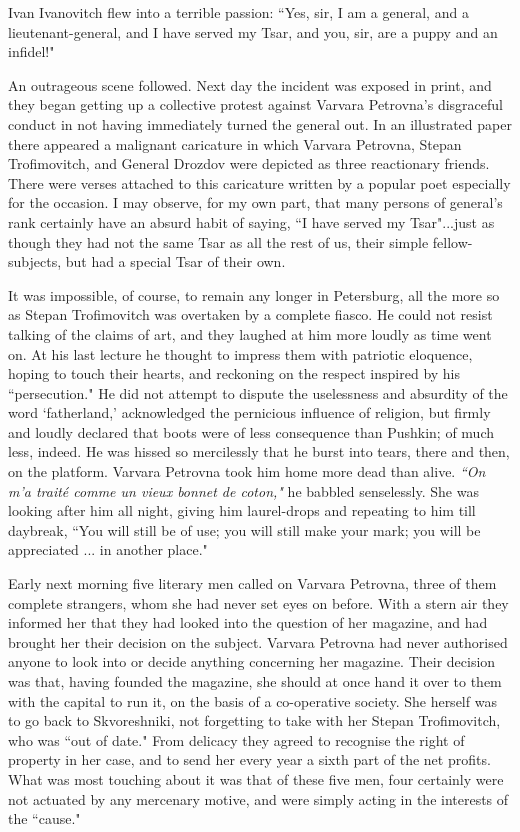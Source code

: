 \documentclass[12pt]{article}
\begin{document}
\vspace{12pt}
Ivan Ivanovitch flew into a terrible passion: ``Yes, sir, I am a general,
and a lieutenant-general, and I have served my Tsar, and you, sir, are a
puppy and an infidel!"


\vspace{12pt}
An outrageous scene followed. Next day the incident was exposed in
print, and they began getting up a collective protest against Varvara
Petrovna's disgraceful conduct in not having immediately turned
the general out. In an illustrated paper there appeared a malignant
caricature in which Varvara Petrovna, Stepan Trofimovitch, and General
Drozdov were depicted as three reactionary friends. There were verses
attached to this caricature written by a popular poet especially for the
occasion. I may observe, for my own part, that many persons of general's
rank certainly have an absurd habit of saying, ``I have served my
Tsar"...just as though they had not the same Tsar as all the rest of us,
their simple fellow-subjects, but had a special Tsar of their own.


\vspace{12pt}
It was impossible, of course, to remain any longer in Petersburg, all
the more so as Stepan Trofimovitch was overtaken by a complete fiasco.
He could not resist talking of the claims of art, and they laughed
at him more loudly as time went on. At his last lecture he thought to
impress them with patriotic eloquence, hoping to touch their hearts,
and reckoning on the respect inspired by his ``persecution." He did
not attempt to dispute the uselessness and absurdity of the word
`fatherland,' acknowledged the pernicious influence of religion, but
firmly and loudly declared that boots were of less consequence than
Pushkin; of much less, indeed. He was hissed so mercilessly that he
burst into tears, there and then, on the platform. Varvara Petrovna took
him home more dead than alive. \emph{``On m'a traité comme un vieux bonnet
de coton,"} he babbled senselessly. She was looking after him all night,
giving him laurel-drops and repeating to him till daybreak, ``You will
still be of use; you will still make your mark; you will be appreciated
... in another place."


\vspace{12pt}
Early next morning five literary men called on Varvara Petrovna, three
of them complete strangers, whom she had never set eyes on before. With
a stern air they informed her that they had looked into the question of
her magazine, and had brought her their decision on the subject. Varvara
Petrovna had never authorised anyone to look into or decide anything
concerning her magazine. Their decision was that, having founded the
magazine, she should at once hand it over to them with the capital to
run it, on the basis of a co-operative society. She herself was to
go back to Skvoreshniki, not forgetting to take with her Stepan
Trofimovitch, who was ``out of date." From delicacy they agreed to
recognise the right of property in her case, and to send her every year
a sixth part of the net profits. What was most touching about it
was that of these five men, four certainly were not actuated by any
mercenary motive, and were simply acting in the interests of the
``cause."
\end{document}
